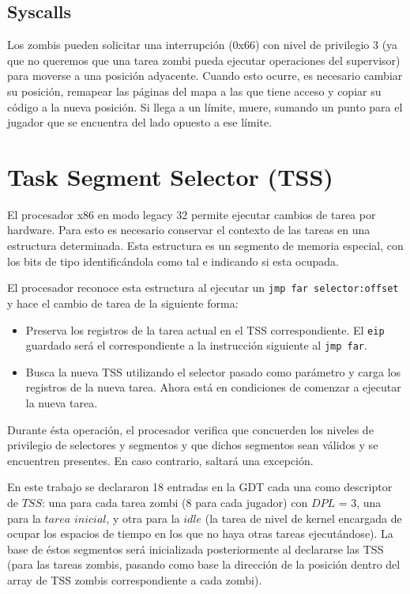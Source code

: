 \documentclass[a4paper]{article}
\begin{document}
\subsection{Syscalls}
Los zombis pueden solicitar una interrupción (0x66) con nivel de privilegio 3 (ya que no queremos que una tarea zombi pueda ejecutar operaciones del supervisor) para moverse a una posición adyacente. Cuando esto ocurre, es necesario cambiar su posición, remapear las páginas del mapa a las que tiene acceso y copiar su código a la nueva posición. Si llega a un límite, muere, sumando un punto para el jugador que se encuentra del lado opuesto a ese límite.

\section{Task Segment Selector (TSS)}
El procesador x86 en modo legacy 32 permite ejecutar cambios de tarea por hardware. Para esto es necesario conservar el contexto de las tareas en una estructura determinada. Esta estructura es un segmento de memoria especial, con los bits de tipo identificándola como tal e indicando si esta ocupada.

El procesador reconoce esta estructura al ejecutar un \texttt{jmp far selector:offset} y hace el cambio de tarea de la siguiente forma: 
\begin{itemize}
\item Preserva los registros de la tarea actual en el TSS correspondiente. El \texttt{eip} guardado será el correspondiente a la instrucción siguiente al \texttt{jmp far}.
\item Busca la nueva TSS utilizando el selector pasado como parámetro y carga los registros de la nueva tarea. Ahora está en condiciones de comenzar a ejecutar la nueva tarea.
\end{itemize}
Durante ésta operación, el procesador verifica que concuerden los niveles de privilegio de selectores y segmentos y que dichos segmentos sean válidos y se encuentren presentes. En caso contrario, saltará una excepción.

En este trabajo se declararon 18 entradas en la GDT cada una como descriptor de $TSS$: una para cada tarea zombi (8 para cada jugador) con $DPL$ = 3, una para la $tarea$ $inicial$, y otra para la $idle$ (la tarea de nivel de kernel encargada de ocupar los espacios de tiempo en los que no haya otras tareas ejecutándose). La base de éstos segmentos será inicializada posteriormente al declararse las TSS (para las tareas zombis, pasando como base la dirección de la posición dentro del array de TSS zombis correspondiente a cada zombi).
\end{document}
